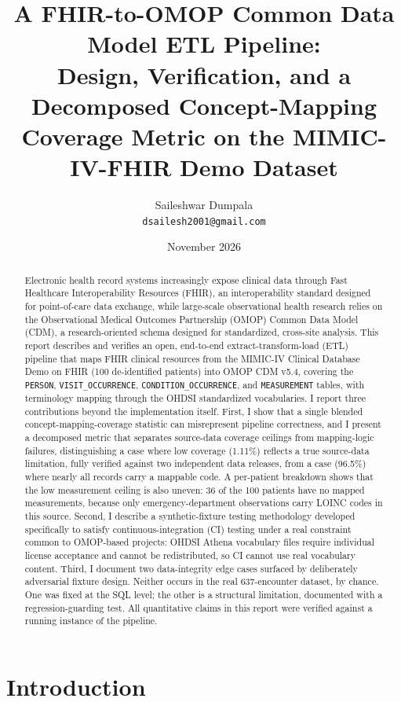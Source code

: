 \documentclass[11pt]{article}
\title{A FHIR-to-OMOP Common Data Model ETL Pipeline: \\
Design, Verification, and a Decomposed Concept-Mapping \\
Coverage Metric on the MIMIC-IV-FHIR Demo Dataset}
\author{Saileshwar Dumpala \\ \small \texttt{dsailesh2001@gmail.com}}
\date{November 2026}
\begin{document}
\maketitle

\begin{abstract}
Electronic health record systems increasingly expose clinical data through
Fast Healthcare Interoperability Resources (FHIR), an interoperability
standard designed for point-of-care data exchange, while large-scale
observational health research relies on the Observational Medical Outcomes
Partnership (OMOP) Common Data Model (CDM), a research-oriented schema
designed for standardized, cross-site analysis. This report describes and
verifies an open, end-to-end extract-transform-load (ETL) pipeline that maps
FHIR clinical resources from the MIMIC-IV Clinical Database Demo on FHIR
(100 de-identified patients) into OMOP CDM v5.4, covering the
\texttt{PERSON}, \texttt{VISIT\_OCCURRENCE}, \texttt{CONDITION\_OCCURRENCE},
and \texttt{MEASUREMENT} tables, with terminology mapping through the OHDSI
standardized vocabularies. I report three contributions beyond the
implementation itself. First, I show that a single blended
concept-mapping-coverage statistic can misrepresent pipeline correctness,
and I present a decomposed metric that separates source-data coverage
ceilings from mapping-logic failures, distinguishing a case where low
coverage (1.11\%) reflects a true source-data limitation, fully verified
against two independent data releases, from a case (96.5\%) where nearly all
records carry a mappable code. A per-patient breakdown shows that the
low measurement ceiling is also uneven: 36 of the 100 patients have no
mapped measurements, because only emergency-department observations carry
LOINC codes in this source. Second, I describe a synthetic-fixture
testing methodology developed specifically to satisfy continuous-integration
(CI) testing under a real constraint common to OMOP-based projects: OHDSI
Athena vocabulary files require individual license acceptance and cannot be
redistributed, so CI cannot use real vocabulary content. Third, I document
two data-integrity edge cases surfaced by deliberately adversarial fixture
design. Neither occurs in the real 637-encounter dataset, by chance. One was
fixed at the SQL level; the other is a structural limitation, documented with
a regression-guarding test. All quantitative claims in this report were
verified against a running instance of the pipeline.
\end{abstract}

\section{Introduction}
\end{document}
